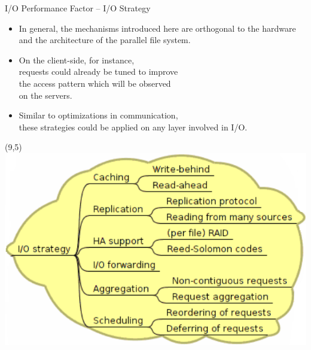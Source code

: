 \documentclass[compress,11pt,xcolor=svgnames,aspectratio=169]{beamer}
\begin{document}
\begin{frame}[fragile] {I/O Performance Factor -- I/O Strategy}

\begin{itemize}
\setlength\itemsep{0.5cm}

  \item In general, the mechanisms introduced here are orthogonal to the hardware and the architecture of the parallel file system.

  \item On the client-side, for instance, \\
  requests could already be tuned to improve \\
  the access pattern which will be observed \\
  on the servers.

  \item Similar to optimizations in communication, \\
  these strategies could be applied on any layer involved in I/O.

\end{itemize}

\begin{textblock}{0}(9,5)
   \includegraphics[scale=0.4]{fig/tree-io-strat}
\end{textblock}


\nocite{SOPPOAASLK13}

\end{frame}
\end{document}
